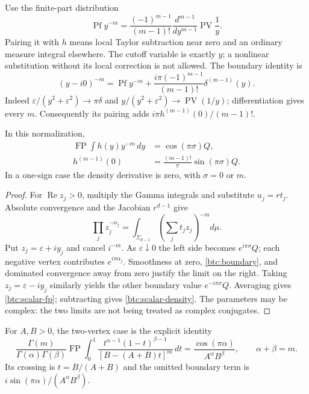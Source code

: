 Use the finite-part distribution
\[
 \operatorname{Pf}y^{-m}
 =\frac{(-1)^{m-1}}{(m-1)!}
              \frac{d^{m-1}}{dy^{m-1}}\operatorname{PV}\frac1y.
\]
Pairing it with $h$ means local Taylor subtraction near zero and an
ordinary measure integral elsewhere. The cutoff variable is exactly
$y$; a nonlinear substitution without its local correction is not allowed.
The boundary identity is
\begin{equation}\label{btc:boundary}
 (y-i0)^{-m}=\operatorname{Pf}y^{-m}
       +\frac{i\pi(-1)^{m-1}}{(m-1)!}\delta^{(m-1)}(y).
\end{equation}
Indeed $\varepsilon/(y^2+\varepsilon^2)\to\pi\delta$ and
$y/(y^2+\varepsilon^2)\to\operatorname{PV}(1/y)$; differentiation
gives every $m$. Consequently its pairing adds
$i\pi h^{(m-1)}(0)/(m-1)!$.

\begin{theorem}\label{btc:scalar}
In this normalization,
\begin{align}
 \operatorname{FP}\int h(y)y^{-m}\,dy&=\cos(\pi\sigma)Q,
                                      \label{btc:scalar-fp}\\
 h^{(m-1)}(0)&=\frac{(m-1)!}{\pi}\sin(\pi\sigma)Q.
                                      \label{btc:scalar-density}
\end{align}
In a one-sign case the density derivative is zero, with $\sigma=0$ or $m$.
\end{theorem}
\begin{proof}
For $\operatorname{Re}z_j>0$, multiply the Gamma integrals and substitute
$u_j=rt_j$. Absolute convergence and the Jacobian $r^{d-1}$ give
\[
 \prod_jz_j^{-\alpha_j}=
       \int_{\Sigma_{d-1}}\left(\sum_jt_jz_j\right)^{-m}d\mu.
\]
Put $z_j=\varepsilon+i y_j$ and cancel $i^{-m}$. As
$\varepsilon\downarrow0$ the left side becomes $e^{i\pi\sigma}Q$;
each negative vertex contributes $e^{i\pi\alpha_j}$. Smoothness at zero,
\eqref{btc:boundary}, and dominated convergence away from zero justify the
limit on the right. Taking $z_j=\varepsilon-i y_j$ similarly yields
the other boundary value $e^{-i\pi\sigma}Q$. Averaging gives
\eqref{btc:scalar-fp}; subtracting gives \eqref{btc:scalar-density}.
The parameters may be complex: the two limits are not being treated as
complex conjugates.
\end{proof}

For $A,B>0$, the two-vertex case is the explicit identity
\begin{equation}\label{btc:two-scalar}
 \frac{\Gamma(m)}{\Gamma(\alpha)\Gamma(\beta)}
 \operatorname{FP}\int_0^1
 \frac{t^{\alpha-1}(1-t)^{\beta-1}}{[B-(A+B)t]^m}\,dt
       =\frac{\cos(\pi\alpha)}{A^\alpha B^\beta},
 \qquad \alpha+\beta=m.
\end{equation}
Its crossing is $t=B/(A+B)$ and the omitted boundary term is
$i\sin(\pi\alpha)/(A^\alpha B^\beta)$.

